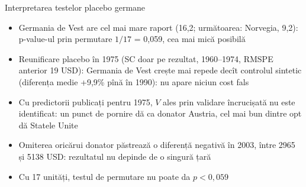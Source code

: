 \begin{frame}{Interpretarea testelor placebo germane}
\itemsize{\small}
\begin{itemize}
    \item Germania de Vest are cel mai mare raport (16{,}2; următoarea: Norvegia, 9{,}2): p-value-ul prin permutare $1/17$ = 0{,}059, cea mai mică posibilă
    \item Reunificare placebo în 1975 (SC doar pe rezultat, 1960--1974, RMSPE anterior 19 USD): Germania de Vest crește mai repede decît controlul sintetic (diferența medie +9{,}9\% pînă în 1990): nu apare niciun cost fals
    \item Cu predictorii publicați pentru 1975, $V$ ales prin validare încrucișată nu este identificat: un punct de pornire dă ca donator Austria, cel mai bun dintre opt dă Statele Unite 
    \item Omiterea oricărui donator păstrează o diferență negativă în 2003, între 2965 și 5138 USD: rezultatul nu depinde de o singură țară
    \item Cu 17 unități, testul de permutare nu poate da $p < 0{,}059$
\end{itemize}
\end{frame}

